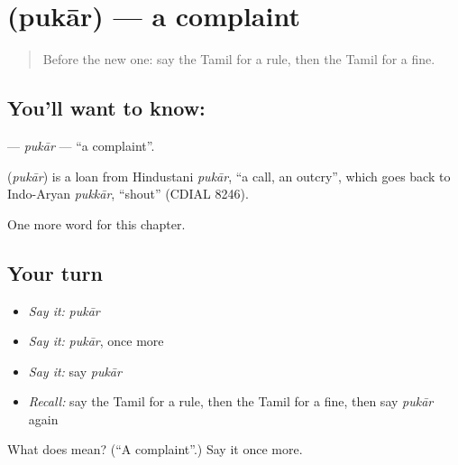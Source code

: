 \section[\texorpdfstring{\ta{புகார்} (pukār)}{புகார் (pukār)}]{ (pukār) — a complaint}

\label{lesson:TA-C280-pukar}



\begin{quote}
Before the new one: say the Tamil for a rule, then the Tamil for a fine.
\end{quote}

\subsection*{You'll want to know: }
\textbf{} — \emph{pukār} — \textquotedblleft{}a complaint\textquotedblright{}.

\begin{cousinweb}
\textbf{} (\emph{pukār}) is a loan from Hindustani \emph{pukār}, \textquotedblleft{}a call, an outcry\textquotedblright{}, which goes back to Indo-Aryan \emph{pukkār}, \textquotedblleft{}shout\textquotedblright{} (CDIAL 8246).
\end{cousinweb}

\begin{grammarlens}[title={What you've built}]
One more word for this chapter.
\end{grammarlens}

\subsection*{Your turn}
\begin{itemize}
\raggedright
  \item \emph{Say it:} \emph{pukār}
  \item \emph{Say it:} \emph{pukār}, once more
  \item \emph{Say it:} say \emph{pukār}
  \item \emph{Recall:} say the Tamil for a rule, then the Tamil for a fine, then say \emph{pukār} again
\end{itemize}

\begin{tcolorbox}[breakable,colback=teal!4,colframe=teal!35!black,title={Before you move on}]
What does  mean? (\textquotedblleft{}A complaint\textquotedblright{}.) Say it once more.
\end{tcolorbox}
